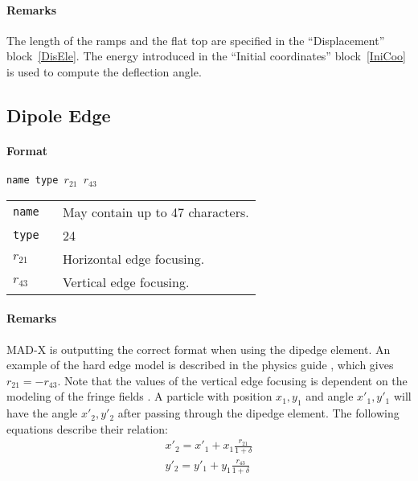 \paragraph{Remarks}
The length of the ramps and the flat top are specified in the ``Displacement'' block~\ref{DisEle}. The energy introduced in the ``Initial coordinates'' block~\ref{IniCoo} is used to compute the deflection angle.

\subsection{Dipole Edge}

\paragraph{Format} \texttt{name type $r_{21}$ $r_{43}$}

\bigskip
\begin{tabular}{@{}lp{0.8\linewidth}}
    \texttt{name} & May contain up to 47 characters. \\
    \texttt{type} & 24 \\
    \texttt{$r_{21}$} & Horizontal edge focusing. \\
    \texttt{$r_{43}$} & Vertical edge focusing.
\end{tabular}

\paragraph{Remarks}
MAD-X is outputting the correct format when using the dipedge element. An example of  the hard edge model is described in the physics guide \cite{sixphys}, which gives $r_{21} = -r_{43}$.
Note that the values of the vertical edge focusing is dependent on the modeling of the fringe fields \cite{dipedge}.
A particle with position $x_{1},y_1$ and angle $x'_{1},y'_1$ will have the angle $x'_{2},y'_2$ after passing through the dipedge element.
The following equations describe their relation:
\begin{eqnarray}
    x'_{2} = x'_{1} + x_{1}\frac{r_{21}}{1+\delta} \\
    y'_{2} = y'_{1} + y_{1}\frac{r_{43}}{1+\delta}
\end{eqnarray}


